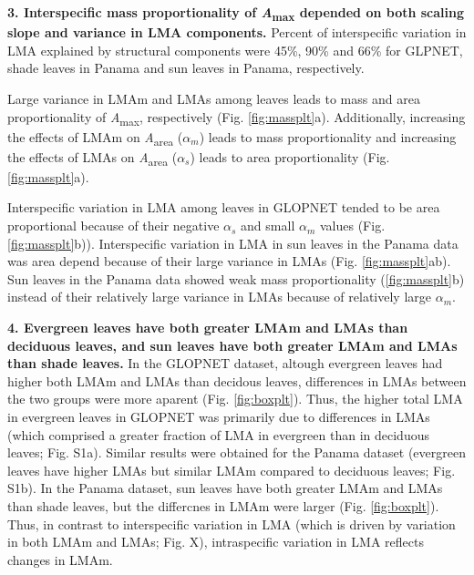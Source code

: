 \documentclass[
  12pt,
]{article}
\begin{document}
\textbf{3. Interspecific mass proportionality of \emph{A}\textsubscript{max} depended on both scaling slope and variance in LMA components.}
Percent of interspecific variation in LMA explained by structural components were 45\%, 90\% and 66\% for GLPNET, shade leaves in Panama and sun leaves in Panama, respectively.

Large variance in LMAm and LMAs among leaves leads to mass and area proportionality of \emph{A}\textsubscript{max}, respectively (Fig. \ref{fig:massplt}a). Additionally, increasing the effects of LMAm on \emph{A}\textsubscript{area} (\(\alpha_m\)) leads to mass proportionality and increasing the effects of LMAs on \emph{A}\textsubscript{area} (\(\alpha_s\)) leads to area proportionality (Fig. \ref{fig:massplt}a).

Interspecific variation in LMA among leaves in GLOPNET tended to be area proportional because of their negative \(\alpha_s\) and small \(\alpha_m\) values (Fig. \ref{fig:massplt}b)).
Interspecific variation in LMA in sun leaves in the Panama data was area depend because of their large variance in LMAs (Fig. \ref{fig:massplt}ab).
Sun leaves in the Panama data showed weak mass proportionality (\ref{fig:massplt}b) instead of their relatively large variance in LMAs because of relatively large \(\alpha_m\).

\textbf{4. Evergreen leaves have both greater LMAm and LMAs than deciduous leaves, and sun leaves have both greater LMAm and LMAs than shade leaves.}
In the GLOPNET dataset, altough evergreen leaves had higher both LMAm and LMAs than decidous leaves, differences in LMAs between the two groups were more aparent (Fig. \ref{fig:boxplt}).
Thus, the higher total LMA in evergreen leaves in GLOPNET was primarily due to differences in LMAs (which comprised a greater fraction of LMA in evergreen than in deciduous leaves; Fig. S1a).
Similar results were obtained for the Panama dataset (evergreen leaves have higher LMAs but similar LMAm compared to deciduous leaves; Fig. S1b).
In the Panama dataset, sun leaves have both greater LMAm and LMAs than shade leaves, but the differcnes in LMAm were larger (Fig. \ref{fig:boxplt}).
Thus, in contrast to interspecific variation in LMA (which is driven by variation in both LMAm and LMAs; Fig. X), intraspecific variation in LMA reflects changes in LMAm.
\end{document}
